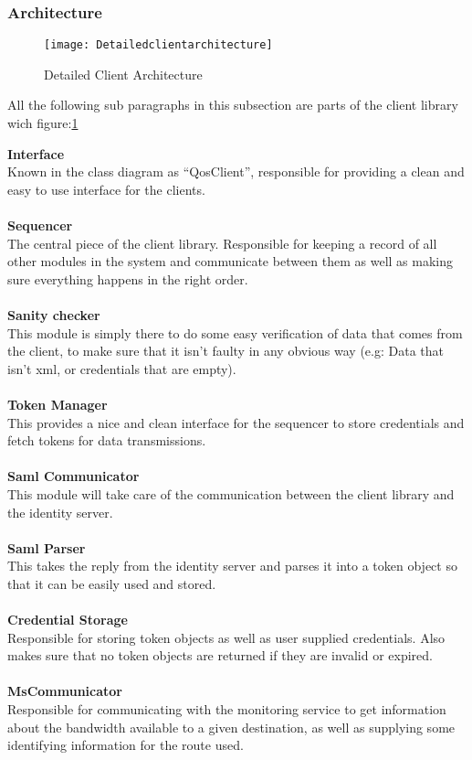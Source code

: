 	\subsubsection{Architecture}\label{client architecture}
		\begin{figure}[h]
			\centering	
			\texttt{[image: Detailedclientarchitecture]}
			\caption{Detailed Client Architecture}
			\label{fig:DetailedClientArchitecture}
		\end{figure}

    All the following sub paragraphs in this subsection are parts of the client library wich figure:\ref{fig:DetailedClientArchitecture}    
    
		\indent \indent \textbf{Interface} \\
Known in the class diagram as “QosClient”, responsible for providing a clean and easy to use interface for the clients.
\\\\
		\indent \textbf{Sequencer} \\
The central piece of the client library. Responsible for keeping a record of all other modules in the system and communicate between them as well as making sure everything happens in the right order.
\\\\
		\indent \textbf{Sanity checker} \\
This module is simply there to do some easy verification of data that comes from the client, to make sure that it isn’t faulty in any obvious way (e.g: Data that isn’t xml, or credentials that are empty).
\\\\
		\indent \textbf{Token Manager} \\
This provides a nice and clean interface for the sequencer to store credentials and fetch tokens for data transmissions.
\\\\
		\indent \textbf{Saml Communicator} \\
This module will take care of the communication between the client library and the identity server.
\\\\
		\indent \textbf{Saml Parser} \\
This takes the reply from the identity server and parses it into a token object so that it can be easily used and stored.
\\\\
		\indent \textbf{Credential Storage} \\
Responsible for storing token objects as well as user supplied credentials. Also makes sure that no token objects are returned if they are invalid or expired.
\\\\
		\indent \textbf{MsCommunicator} \\
Responsible for communicating with the monitoring service to get information about the bandwidth available to a given destination, as well as supplying some identifying information for the route used.

